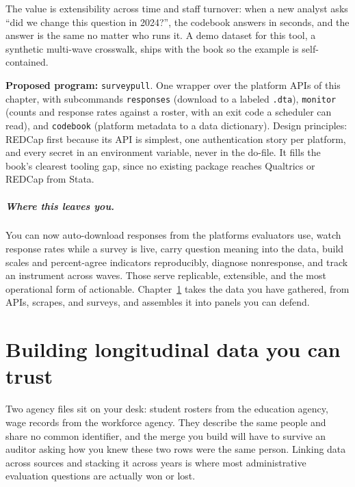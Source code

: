 \documentclass[
    a4paper,
    fontsize=10pt,
    twoside=true,
    numbers=noenddot,
]{kaobook}
\begin{document}
The value is extensibility across time and staff turnover: when a new analyst asks \enquote{did we change this question in 2024?}, the codebook answers in seconds, and the answer is the same no matter who runs it. A demo dataset for this tool, a synthetic multi-wave crosswalk, ships with the book so the example is self-contained. %

\begin{kaobox}[frametitle=Ado-file Idea: \texttt{surveypull}]
\textbf{Proposed program:} \texttt{surveypull}. One wrapper over the platform APIs of this chapter, with subcommands \texttt{responses} (download to a labeled \texttt{.dta}), \texttt{monitor} (counts and response rates against a roster, with an exit code a scheduler can read), and \texttt{codebook} (platform metadata to a data dictionary). Design principles: REDCap first because its API is simplest, one authentication story per platform, and every secret in an environment variable, never in the do-file. It fills the book's clearest tooling gap, since no existing package reaches Qualtrics or REDCap from Stata.
\end{kaobox}

\paragraph{Where this leaves you.} You can now auto-download responses from the platforms evaluators use, watch response rates while a survey is live, carry question meaning into the data, build scales and percent-agree indicators reproducibly, diagnose nonresponse, and track an instrument across waves. Those serve replicable, extensible, and the most operational form of actionable. Chapter~\ref{ch:panels} takes the data you have gathered, from APIs, scrapes, and surveys, and assembles it into panels you can defend.

\chapter{Building longitudinal data you can trust}\label{ch:panels}

Two agency files sit on your desk: student rosters from the education agency, wage records from the workforce agency. They describe the same people and share no common identifier, and the merge you build will have to survive an auditor asking how you knew these two rows were the same person. Linking data across sources and stacking it across years is where most administrative evaluation questions are actually won or lost.
\end{document}
